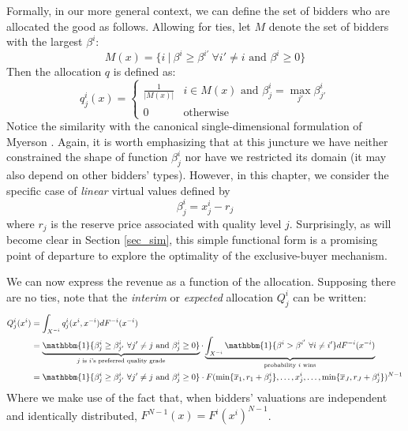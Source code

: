 Formally, in our more general context, we can define the set of bidders who are allocated the good as follows. Allowing for ties, let $M$ denote the set of bidders with the largest $\beta^i$:
\begin{equation}
    M(x) = \{ i \ | \ \beta^i \geq \beta^{i'} \ \forall i' \neq i \text{ and } \beta^i \geq 0 \}
\end{equation}
\noindent Then the allocation $q$ is defined as:
\begin{equation}
    q_j^i(x) = \begin{cases}
        \frac{1}{|M(x)|} & i \in M(x) \text{ and } \beta_j^i = \max_{j'} \beta_{j'}^i \\
        0 & \text{otherwise}
    \end{cases}
\end{equation}
\noindent Notice the similarity with the canonical single-dimensional formulation of Myerson \autocite*{myerson1981optimal}. Again, it is worth emphasizing that at this juncture we have neither constrained the shape of function $\beta_j^i$ nor have we restricted its domain (it may also depend on other bidders' types). However, in this chapter, we consider the specific case of \textit{linear} virtual values defined by
\begin{equation}
    \beta_j^i = x_j^i - r_j
\end{equation}
\noindent where $r_j$ is the reserve price associated with quality level $j$. Surprisingly, as will become clear in Section \ref{sec_sim}, this simple functional form is a promising point of departure to explore the optimality of the exclusive-buyer mechanism. 

We can now express the revenue as a function of the allocation. Supposing there are no ties, note that the \textit{interim} or \textit{expected} allocation $Q_j^i$ can be written:
\begin{align}
    Q_j^i(x^i) &= \int_{X^{-i}} q_j^i(x^i,x^{-i}) dF^{-i}(x^{-i}) \\
        &= \underbrace{\mathbbm{1} \{ \beta_j^i \geq \beta_{j'}^i \ \forall j' \neq j \text{ and } \beta_j^i \geq 0 \}}_{\text{$j$ is $i$'s preferred quality grade}} \cdot \underbrace{\int_{X^{-i}} \mathbbm{1} \{ \beta^i > \beta^{i'} \ \forall i \neq i' \} dF^{-i}(x^{-i})}_{\text{probability $i$ wins}} \\
        &= \mathbbm{1} \{ \beta_j^i \geq \beta_{j'}^i \ \forall j' \neq j \text{ and } \beta_j^i \geq 0 \} \cdot F(\min \{ \overline{x}_1, r_1 + \beta_j^i \}, \dots, x_j^i, \dots, \min \{ \overline{x}_J, r_J + \beta_j^i \})^{N-1}
\end{align}
\noindent Where we make use of the fact that, when bidders' valuations are independent and identically distributed, $F^{N-1}(x) = F^i(x^i)^{N-1}$. 


